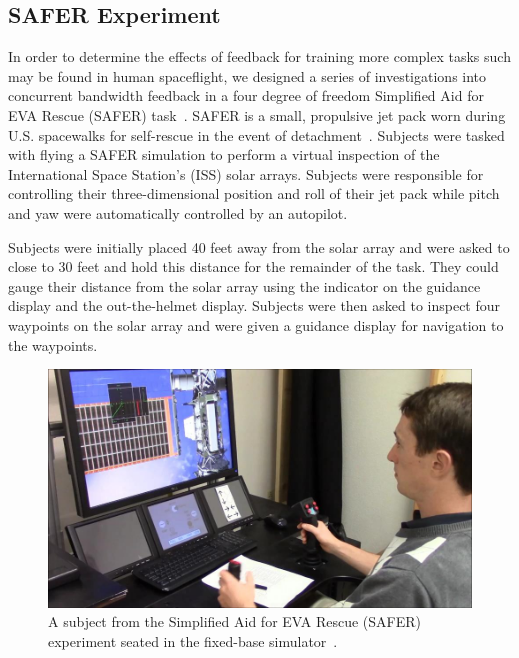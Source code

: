 \subsection{SAFER Experiment} \label{safersection}
In order to determine the effects of feedback for training more complex tasks such may be found in human spaceflight, we designed a series of investigations into concurrent bandwidth feedback in a four degree of freedom Simplified Aid for EVA Rescue (SAFER) task~\citep{karasinski_real-time_2016,karasinski_development_2016,karasinski_real-time_2017}.
SAFER is a small, propulsive jet pack worn during U.S. spacewalks for self-rescue in the event of detachment~\citep{Vassigh1998}.
Subjects were tasked with flying a SAFER simulation to perform a virtual inspection of the International Space Station's (ISS) solar arrays.
Subjects were responsible for controlling their three-dimensional position and roll of their jet pack while pitch and yaw were automatically controlled by an autopilot.

Subjects were initially placed 40 feet away from the solar array and were asked to close to 30 feet and hold this distance for the remainder of the task.
They could gauge their distance from the solar array using the indicator on the guidance display and the out-the-helmet display.
Subjects were then asked to inspect four waypoints on the solar array and were given a guidance display for navigation to the waypoints.

\begin{figure}[tb!]
    \begin{center}
        \includegraphics[width=\linewidth]{figures/AR/SAFER_DangerChris.jpg}
        \caption[Simplified Aid for EVA Rescue (SAFER) experiment subject seated in the fixed-base simulator]{A subject from the Simplified Aid for EVA Rescue (SAFER) experiment seated in the fixed-base simulator~\citep{karasinski_real-time_2016}.}
        \label{figure:safersim}
    \end{center}
\end{figure}

